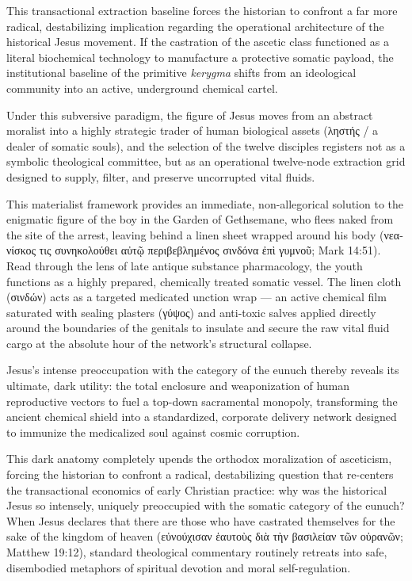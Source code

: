 \documentclass[11pt,twoside,a4paper]{article}
\begin{document}
This transactional extraction baseline forces the historian to confront a far more radical, destabilizing implication regarding the operational architecture of the historical Jesus movement. If the castration of the ascetic class functioned as a literal biochemical technology to manufacture a protective somatic payload, the institutional baseline of the primitive \textit{kerygma} shifts from an ideological community into an active, underground chemical cartel. 

Under this subversive paradigm, the figure of Jesus moves from an abstract moralist into a highly strategic trader of human biological assets (\textgreek{ληστής} / a dealer of somatic souls), and the selection of the twelve disciples registers not as a symbolic theological committee, but as an operational twelve-node extraction grid designed to supply, filter, and preserve uncorrupted vital fluids. 

This materialist framework provides an immediate, non-allegorical solution to the enigmatic figure of the boy  in the Garden of Gethsemane, who flees naked from the site of the arrest, leaving behind a linen sheet wrapped around his body (\textgreek{νεανίσκος τις συνηκολούθει αὐτῷ περιβεβλημένος σινδόνα ἐπὶ γυμνοῦ}; Mark 14:51). Read through the lens of late antique substance pharmacology, the youth functions as a highly prepared, chemically treated somatic vessel. The linen cloth (\textgreek{σινδών}) acts as a targeted medicated unction wrap — an active chemical film saturated with sealing plasters (\textgreek{γύψος}) and anti-toxic salves applied directly around the boundaries of the genitals to insulate and secure the raw vital fluid cargo at the absolute hour of the network's structural collapse. 

Jesus’s intense preoccupation with the category of the eunuch thereby reveals its ultimate, dark utility: the total enclosure and weaponization of human reproductive vectors to fuel a top-down sacramental monopoly, transforming the ancient chemical shield into a standardized, corporate delivery network designed to immunize the medicalized soul against cosmic corruption.

This dark anatomy completely upends the orthodox moralization of asceticism, forcing the historian to confront a radical, destabilizing question that re-centers the transactional economics of early Christian practice: why was the historical Jesus so intensely, uniquely preoccupied with the somatic category of the eunuch? When Jesus declares that there are those who have castrated themselves for the sake of the kingdom of heaven (\textgreek{εὐνούχισαν ἑαυτοὺς διὰ τὴν βασιλείαν τῶν οὐρανῶν}; Matthew 19:12), standard theological commentary routinely retreats into safe, disembodied metaphors of spiritual devotion and moral self-regulation. 
\end{document}

